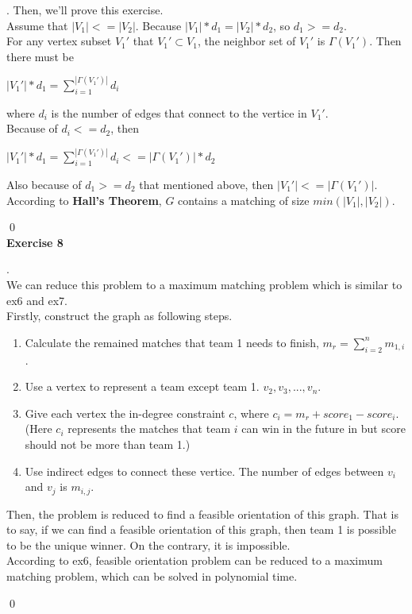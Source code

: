 \documentclass[12pt, notitlepage]{article}
\newenvironment{sol}
  {\par\vspace{3mm}\noindent{\it Solution}.}{\qed}
\begin{document}
\begin{sol}
Then, we'll prove this exercise.\\
Assume that $|V_1| <= |V_2|$. Because $|V_1|*d_1 = |V_2|*d_2$, so $d_1 >= d_2$.\\
For any vertex subset $V_1'$ that $V_1'\subset V_1$, the neighbor set of $V_1'$ is $\Gamma (V_1')$. Then there must be 
\centerline{$|V_1'|*d_1 = \sum\limits^{|\Gamma (V_1')|}_{i=1}d_i$}
where $d_i$ is the number of edges that connect to the vertice in $V_1'$.\\
Because of $d_i <= d_2$, then\\ 
\centerline{$|V_1'|*d_1 = \sum\limits^{|\Gamma (V_1')|}_{i=1}d_i <= |\Gamma (V_1')| * d_2$}
Also because of $d_1 >= d_2$ that mentioned above, then $|V_1'| <= |\Gamma (V_1')|$.\\
According to \textbf{Hall's Theorem},  $G$ contains a matching of size $min(|V_1|, |V_2|)$.

\end{sol}\\

\textbf{Exercise 8}
\begin{sol}\\
We can reduce this problem to a maximum matching problem which is similar to ex6 and ex7.\\
Firstly, construct the graph as following steps.
\begin{enumerate}[1.]
 	\item Calculate the remained matches that team 1 needs to finish, $m_r = \sum_{i=2}^{n}m_{1,i}$.
 	\item Use a vertex to represent a team except team 1. $v_2,v_3,...,v_n$.
 	\item Give each vertex the in-degree constraint $c$, where $c_i = m_r + score_1 - score_i$. (Here $c_i$ represents the matches that team $i$ can win in the future in but score should not be more than team 1.)
 	\item Use indirect edges to connect these vertice. The number of edges between $v_i$ and $v_j$ is $m_{i,j}$.
\end{enumerate}
 
Then, the problem is reduced to find a feasible orientation of this graph. That is to say, if we can find a feasible orientation of this graph, then team 1 is possible to be the unique winner. On the contrary, it is impossible.\\
According to ex6, feasible orientation problem can be reduced to a maximum matching problem, which can be solved in polynomial time.



\end{sol}\\
\end{document}
